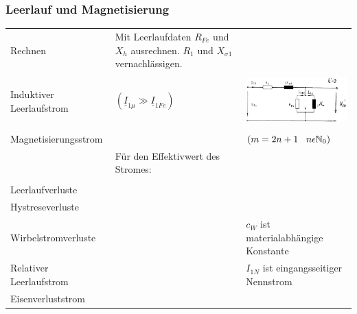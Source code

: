 		\subsubsection{Leerlauf und Magnetisierung}
			\begin{tabular}{p{5cm}p{6cm}p{7cm}}
            	Rechnen &
            		\begin{minipage}{13cm}
                    	Mit Leerlaufdaten $R_{Fe}$ und $X_h$ ausrechnen. $R_1$ und $X_{\sigma1}$ vernachlässigen.
                    \end{minipage} \\ \\
            	Induktiver Leerlaufstrom &
            		\fbox{$\underline{I}_{10} = \underline{I}_{1Fe} + \underline{I}_{1\mu}$} $(\underline{I}_{1\mu} \gg \underline{I}_{1Fe})$ &
            		\begin{minipage}{8cm}
	            		\includegraphics[width=5cm]{bilder/ErsatzschaltbildTrafoLeerlauf.png}
	            	\end{minipage} \\ \\
				Magnetisierungsstrom &
					\fbox{$i_\mu = \sqrt{2}I_{\mu1}\cdot \sin(\omega t) + \sqrt{2}I_{\mu3}\cdot \sin(3\omega t) + \sqrt{2}I_{\mu m}\cdot \sin(m\omega t)$} &
					\hspace{3.3cm}$(m=2n+1 \hspace{0.3cm} n\epsilon \mathbb{N}_0)$ \\
					&
					Für den Effektivwert des Stromes: &
					\fbox{$I_{\mu RMS} = \sqrt{I_{\mu1}^2 + I_{\mu3}^2 +\ldots+ I_{\mu m}} $}\\ \\
				Leerlaufverluste &
					\fbox{$P_0 = P_{0Cu} + P_{0Hy} + P_{0Wi}$} \\
				Hystreseverluste &
					\fbox{$P_{Hy} \sim f \cdot B^2$} \\
				Wirbelstromverluste &
					\fbox{$v_W = c_W \cdot f^2 \cdot B^2$} &
					$c_W$ ist materialabhängige Konstante \\
				Relativer Leerlaufstrom &
					\fbox{$i_{0N} = \frac{I_{0N}}{I_{1N}}$} &
					$I_{1N}$ ist eingangsseitiger Nennstrom \\
				Eisenverluststrom &
					\fbox{$I_{Fe} = \frac{P_{0N}}{U_{1N}} = I_0 \cdot \cos(\varphi_0)$} \\

\end{tabular}

